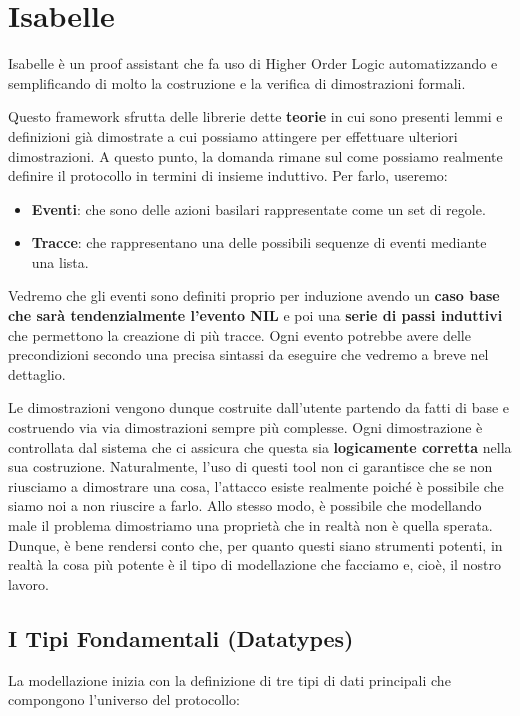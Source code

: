 \section{Isabelle}
Isabelle è un proof assistant che fa uso di Higher Order Logic automatizzando e semplificando di molto la costruzione e la verifica di dimostrazioni formali.

Questo framework sfrutta delle librerie dette \textbf{teorie} in cui sono presenti lemmi e definizioni già dimostrate a cui possiamo attingere per effettuare ulteriori dimostrazioni. A questo punto, la domanda rimane sul come possiamo realmente definire il protocollo in termini di insieme induttivo. Per farlo, useremo:
\begin{itemize}
    \item \textbf{Eventi}: che sono delle azioni basilari rappresentate come un set di regole.
    \item \textbf{Tracce}: che rappresentano una delle possibili sequenze di eventi mediante una lista.
\end{itemize}
Vedremo che gli eventi sono definiti proprio per induzione avendo un \textbf{caso base che sarà tendenzialmente l'evento NIL} e poi una \textbf{serie di passi induttivi} che permettono la creazione di più tracce. Ogni evento potrebbe avere delle precondizioni secondo una precisa sintassi da eseguire che vedremo a breve nel dettaglio.

Le dimostrazioni vengono dunque costruite dall'utente partendo da fatti di base e costruendo via via dimostrazioni sempre più complesse. Ogni dimostrazione è controllata dal sistema che ci assicura che questa sia \textbf{logicamente corretta} nella sua costruzione. Naturalmente, l'uso di questi tool non ci garantisce che se non riusciamo a dimostrare una cosa, l'attacco esiste realmente poiché è possibile che siamo noi a non riuscire a farlo. Allo stesso modo, è possibile che modellando male il problema dimostriamo una proprietà che in realtà non è quella sperata. Dunque, è bene rendersi conto che, per quanto questi siano strumenti potenti, in realtà la cosa più potente è il tipo di modellazione che facciamo e, cioè, il nostro lavoro.

\subsection{I Tipi Fondamentali (Datatypes)}
La modellazione inizia con la definizione di tre tipi di dati principali che compongono l'universo del protocollo:

